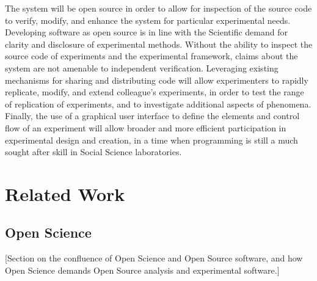 \documentclass[12pt,a4paper,titlepage]{scrreprt}
\begin{document}
    The system will be open source in order to allow for inspection of the source code to verify, modify, and enhance the system for particular experimental needs. Developing software as open source is in line with the Scientific demand for clarity and disclosure of experimental methods. Without the ability to inspect the source code of experiments and the experimental framework, claims about the system are not amenable to independent verification.
    Leveraging existing mechanisms for sharing and distributing code will allow experimenters to rapidly replicate, modify, and extend colleague's experiments, in order to test the range of replication of experiments, and to investigate additional aspects of phenomena. Finally, the use of a graphical user interface to define the elements and control flow of an experiment will allow broader and more efficient participation in experimental design and creation, in a time when programming is still a much sought after skill in Social Science laboratories.

\newpage

\chapter{Related Work}
\section{Open Science}
[Section on the confluence of Open Science and Open Source software, and how Open Science demands Open Source analysis and experimental software.]
\end{document}
